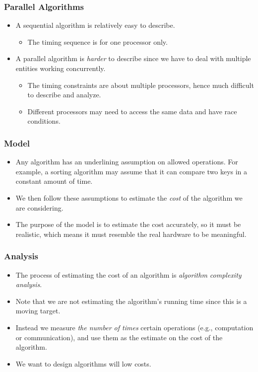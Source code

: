 \documentclass{beamer}
\begin{document}
\begin{CJK}{UTF8}{bsmi}
\begin{frame}
\frametitle{Parallel Algorithms}
\begin{itemize}
\item A sequential algorithm is relatively easy to describe.
\begin{itemize}
\item The timing sequence is for one processor only.
\end{itemize}
\item A parallel algorithm is {\em harder} to describe since we have
  to deal with multiple entities working concurrently.
\begin{itemize}
\item The timing constraints are about multiple processors, hence much
  difficult to describe and analyze.
\item Different processors may need to access the same data and have race conditions.
\end{itemize}
\end{itemize}
\end{frame}

\begin{frame}
\frametitle{Model}
\begin{itemize}
\item Any algorithm has an underlining assumption on allowed operations.
For example, a sorting algorithm may assume that it can compare two keys in a constant amount of time.
\item We then follow these assumptions to estimate the {\em cost} of the algorithm we are considering.
\item The purpose of the model is to estimate the cost accurately, so it must be realistic, which means it must resemble the real hardware to be meaningful.
\end{itemize}
\end{frame}

\begin{frame}
\frametitle{Analysis}
\begin{itemize}
\item The process of estimating the cost of an algorithm is {\em
  algorithm complexity analysis}.
\item Note that we are not estimating the algorithm's running time since this is a moving target.
\item Instead we measure {\em the number of times} certain operations
  (e.g., computation or communication), and use them as the estimate
  on the cost of the algorithm.
\item We want to design algorithms will low costs.
\end{itemize}
\end{frame}



\end{CJK}
\end{document}
